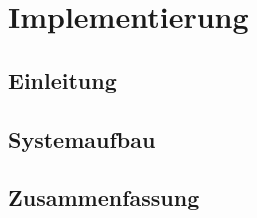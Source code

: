 \section{Implementierung}
\subsection{Einleitung}

\subsection{Systemaufbau}

\subsection{Zusammenfassung}